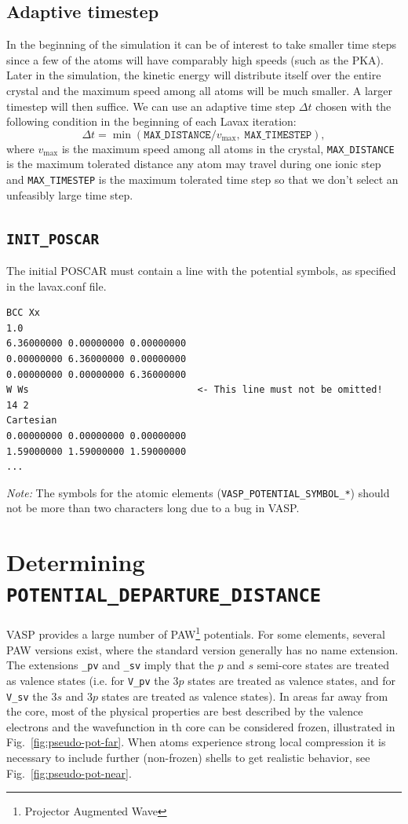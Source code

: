 \documentclass{article}
\begin{document}
\subsection{Adaptive timestep}
\label{sec:adaptive_timestep}
In the beginning of the simulation it can be of interest to take smaller time steps since a few of the atoms will have comparably high speeds (such as the PKA). Later in the simulation, the kinetic energy will distribute itself over the entire crystal and the maximum speed among all atoms will be much smaller.
A larger timestep will then suffice. We can use an adaptive time step $\Delta t$ chosen with the following condition in the beginning of each Lavax iteration:
\begin{equation*}
  \Delta t = \min{(\texttt{MAX\_DISTANCE}/v_{\text{max}},\; \texttt{MAX\_TIMESTEP})},
\end{equation*}
where $v_{\text{max}}$ is the maximum speed among all atoms in the crystal, \texttt{MAX\_DISTANCE} is the maximum tolerated distance any atom may travel during one ionic step and \texttt{MAX\_TIMESTEP} is the maximum tolerated time step so that we don't select an unfeasibly large time step.

\subsection{\texttt{INIT\_POSCAR}}
The initial POSCAR must contain a line with the potential symbols, as specified in the lavax.conf file.
\begin{verbatim}
BCC Xx 
1.0
6.36000000 0.00000000 0.00000000
0.00000000 6.36000000 0.00000000
0.00000000 0.00000000 6.36000000
W Ws                              <- This line must not be omitted!
14 2
Cartesian
0.00000000 0.00000000 0.00000000
1.59000000 1.59000000 1.59000000
...
\end{verbatim}

\textit{Note: } The symbols for the atomic elements (\texttt{VASP\_POTENTIAL\_SYMBOL\_*}) should not be more than two characters long due to a bug in VASP.

\newpage
\section{Determining \texttt{POTENTIAL\_DEPARTURE\_DISTANCE}}
VASP provides a large number of PAW\footnote{Projector Augmented Wave} potentials. For some elements, several PAW versions exist, where the standard version generally has no name extension. The extensions \texttt{\_pv} and \texttt{\_sv} imply that the $p$ and $s$ semi-core states are treated as valence states (i.e. for \texttt{V\_pv} the $3p$ states are treated as valence states, and for \texttt{V\_sv} the $3s$ and $3p$ states are treated as valence states). In areas far away from the core, most of the physical properties are best described by the valence electrons and the wavefunction in th core can be considered frozen, illustrated in Fig.~\ref{fig:pseudo-pot-far}. When atoms experience strong local compression it is necessary to include further (non-frozen) shells to get realistic behavior, see Fig.~\ref{fig:pseudo-pot-near}.
\end{document}

